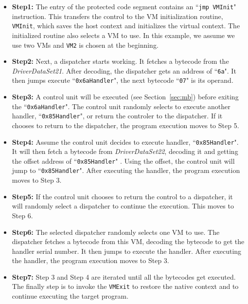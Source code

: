 \documentclass[conference]{IEEEtran}
\begin{document}
\begin{itemize}
\item \textbf{Step1:} The entry of the protected code segment contains an ``\texttt{jmp VMInit}" instruction. This transfers the control to the VM initialization routine, \texttt{VMInit}, which saves the host context and initializes the virtual context. The initialized routine also selects a VM to use. In this example, we assume we use two VMs and \texttt{VM2} is chosen at the beginning.
\item \textbf{Step2:} Next, a dispatcher starts working. It fetches a bytecode from the \emph{DriverDataSet21}. After decoding, the dispatcher gets an address of ``\texttt{6a}". It then jumps execute ``\texttt{0x6aHandler}", the next bytecode ``\texttt{07}" is its operand.
\item \textbf{Step3:} A control unit will be executed (see Section~\ref{sec:mb}) before exiting the ``\texttt{0x6aHandler}". The control unit randomly selects to execute another handler, ``\texttt{0x85Handler}", or return the controler to the dispatcher. If it chooses to return to the dispatcher, the program execution moves to Step 5.
\item \textbf{Step4:} Assume the control unit decides to execute handler, ``\texttt{0x85Handler}". It will then fetch a bytecode from \emph{DriverDataSet22}, decoding it and getting the offset address of ``\texttt{0x85Handler}" . Using the offset, the control unit will jump to ``\texttt{0x85Handler}". After executing the handler, the program execution moves to Step 3.
\item \textbf{Step5:} If the control unit chooses to return the control to a dispatcher, it will randomly select a dispatcher to continue the execution. This moves to Step 6.
\item \textbf{Step6:} The selected dispatcher randomly selects one VM to use. The dispatcher fetches a bytecode from this VM, decoding the bytecode to get the handler serial number. 
    It then jumps to execute the handler. After executing the handler, the program execution moves to Step 3.
\item \textbf{Step7:} Step 3 and Step 4 are iterated until all the bytecodes get executed. The finally step is to invoke the \texttt{VMExit} to restore the native context and to continue executing the target program.
\end{itemize}
\end{document}
